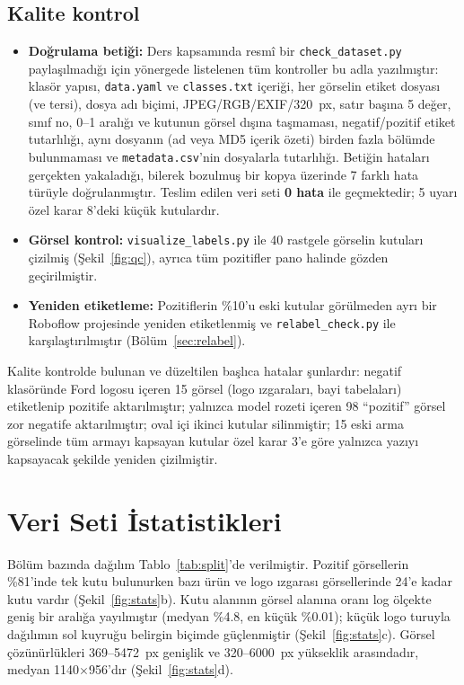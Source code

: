 \documentclass[conference]{IEEEtran}
\newcommand{\kod}[1]{\texttt{\small #1}}
\begin{document}
\subsection{Kalite kontrol}

\begin{itemize}
\item \textbf{Doğrulama betiği:} Ders kapsamında resmî bir \kod{check\_dataset.py}
paylaşılmadığı için yönergede listelenen tüm kontroller bu adla yazılmıştır: klasör yapısı,
\kod{data.yaml} ve \kod{classes.txt} içeriği, her görselin etiket dosyası (ve tersi), dosya adı
biçimi, JPEG/RGB/EXIF/320~px, satır başına 5 değer, sınıf no, 0--1 aralığı ve kutunun görsel
dışına taşmaması, negatif/pozitif etiket tutarlılığı, aynı dosyanın (ad veya MD5 içerik
özeti) birden fazla bölümde bulunmaması ve \kod{metadata.csv}'nin dosyalarla tutarlılığı.
Betiğin hataları gerçekten yakaladığı, bilerek bozulmuş bir kopya üzerinde 7 farklı hata
türüyle doğrulanmıştır. Teslim edilen veri seti \textbf{0 hata} ile geçmektedir; 5 uyarı
özel karar 8'deki küçük kutulardır.
\item \textbf{Görsel kontrol:} \kod{visualize\_labels.py} ile 40 rastgele görselin kutuları
çizilmiş (Şekil~\ref{fig:qc}), ayrıca tüm pozitifler pano halinde gözden geçirilmiştir.
\item \textbf{Yeniden etiketleme:} Pozitiflerin \%10'u eski kutular görülmeden ayrı bir
Roboflow projesinde yeniden etiketlenmiş ve \kod{relabel\_check.py} ile karşılaştırılmıştır
(Bölüm~\ref{sec:relabel}).
\end{itemize}

Kalite kontrolde bulunan ve düzeltilen başlıca hatalar şunlardır: negatif klasöründe Ford
logosu içeren 15 görsel (logo ızgaraları, bayi tabelaları) etiketlenip pozitife aktarılmıştır;
yalnızca model rozeti içeren 98 ``pozitif'' görsel zor negatife aktarılmıştır; oval içi ikinci
kutular silinmiştir; 15 eski arma görselinde tüm armayı kapsayan kutular özel karar 3'e göre
yalnızca yazıyı kapsayacak şekilde yeniden çizilmiştir.

\section{Veri Seti İstatistikleri}

Bölüm bazında dağılım Tablo~\ref{tab:split}'de verilmiştir. Pozitif görsellerin \%81'inde
tek kutu bulunurken bazı ürün ve logo ızgarası görsellerinde 24'e kadar kutu vardır
(Şekil~\ref{fig:stats}b). Kutu alanının görsel alanına oranı log ölçekte geniş bir aralığa
yayılmıştır (medyan \%4.8, en küçük \%0.01); küçük logo turuyla dağılımın sol kuyruğu
belirgin biçimde güçlenmiştir (Şekil~\ref{fig:stats}c). Görsel çözünürlükleri
369--5472~px genişlik ve 320--6000~px yükseklik arasındadır, medyan 1140$\times$956'dır
(Şekil~\ref{fig:stats}d).
\end{document}
